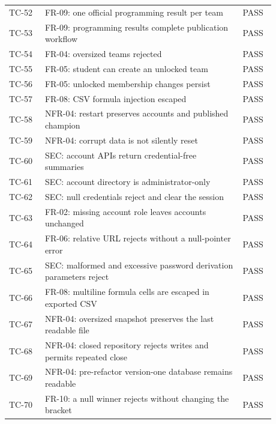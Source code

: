 \begin{longtable}{p{0.12\linewidth}p{0.66\linewidth}p{0.1\linewidth}}
TC-52 & FR-09: one official programming result per team & PASS\\
TC-53 & FR-09: programming results complete publication workflow & PASS\\
TC-54 & FR-04: oversized teams rejected & PASS\\
TC-55 & FR-05: student can create an unlocked team & PASS\\
TC-56 & FR-05: unlocked membership changes persist & PASS\\
TC-57 & FR-08: CSV formula injection escaped & PASS\\
TC-58 & NFR-04: restart preserves accounts and published champion & PASS\\
TC-59 & NFR-04: corrupt data is not silently reset & PASS\\
TC-60 & SEC: account APIs return credential-free summaries & PASS\\
TC-61 & SEC: account directory is administrator-only & PASS\\
TC-62 & SEC: null credentials reject and clear the session & PASS\\
TC-63 & FR-02: missing account role leaves accounts unchanged & PASS\\
TC-64 & FR-06: relative URL rejects without a null-pointer error & PASS\\
TC-65 & SEC: malformed and excessive password derivation parameters reject & PASS\\
TC-66 & FR-08: multiline formula cells are escaped in exported CSV & PASS\\
TC-67 & NFR-04: oversized snapshot preserves the last readable file & PASS\\
TC-68 & NFR-04: closed repository rejects writes and permits repeated close & PASS\\
TC-69 & NFR-04: pre-refactor version-one database remains readable & PASS\\
TC-70 & FR-10: a null winner rejects without changing the bracket & PASS\\
\bottomrule\end{longtable}\normalsize
